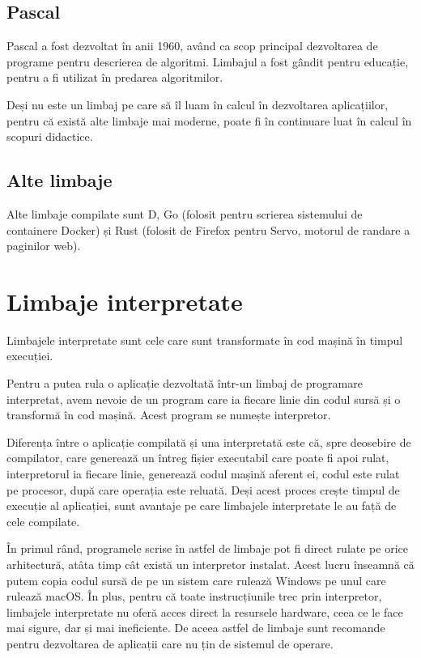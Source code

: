 \subsection{Pascal}
\label{sec:appdev:compiled-lang:pascal}

Pascal a fost dezvoltat în anii 1960, având ca scop principal dezvoltarea de
programe pentru descrierea de algoritmi. Limbajul a fost gândit pentru educație,
pentru a fi utilizat în predarea algoritmilor.

Deși nu este un limbaj pe care să îl luam în calcul în dezvoltarea aplicațiilor,
pentru că există alte limbaje mai moderne, poate fi în continuare luat în calcul
în scopuri didactice.

\subsection{Alte limbaje}
\label{sec:appdev:compiled-lang:other}

Alte limbaje compilate sunt D, Go (folosit pentru scrierea sistemului de
containere Docker) și Rust (folosit de Firefox pentru Servo, motorul de randare
a paginilor web).

\section{Limbaje interpretate}
\label{sec:appdev-langs-int}

Limbajele interpretate sunt cele care sunt transformate în cod mașină în timpul
execuției.

Pentru a putea rula o aplicație dezvoltată într-un limbaj de programare
interpretat, avem nevoie de un program care ia fiecare linie din codul sursă și
o transformă în cod mașină. Acest program se numește interpretor.

Diferența între o aplicație compilată și una interpretată este că, spre deosebire
de compilator, care generează un întreg fișier executabil care poate fi apoi
rulat, interpretorul ia fiecare linie, generează codul mașină aferent ei, codul
este rulat pe procesor, după care operația este reluată. Deși acest proces
crește timpul de execuție al aplicației, sunt avantaje pe care limbajele
interpretate le au față de cele compilate.

În primul rând, programele scrise în astfel de limbaje pot fi direct rulate pe
orice arhitectură, atâta timp cât există un interpretor instalat. Acest lucru înseamnă
că putem copia codul sursă de pe un sistem care rulează Windows pe unul care
rulează macOS. În plus, pentru că toate instrucțiunile trec prin interpretor,
limbajele interpretate nu oferă acces direct la resursele hardware, ceea ce le
face mai sigure, dar și mai ineficiente. De aceea astfel de limbaje sunt
recomande pentru dezvoltarea de aplicații care nu țin de sistemul de operare.


